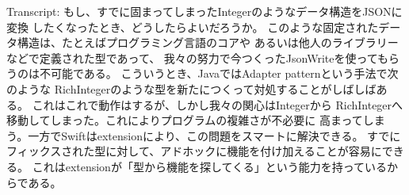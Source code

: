 \begin{frame}[fragile]
\begin{notes}
    \item Transcript:
    もし、すでに固まってしまったIntegerのようなデータ構造をJSONに変換
    したくなったとき、どうしたらよいだろうか。
    このような固定されたデータ構造は、たとえばプログラミング言語のコアや
    あるいは他人のライブラリーなどで定義された型であって、
    我々の努力で今つくったJsonWriteを使ってもらうのは不可能である。
    こういうとき、JavaではAdapter patternという手法で次のような
    RichIntegerのような型を新たにつくって対処することがしばしばある。
    これはこれで動作はするが、しかし我々の関心はIntegerから
    RichIntegerへ移動してしまった。これによりプログラムの複雑さが不必要に
    高まってしまう。一方でSwiftはextensionにより、この問題をスマートに解決できる。
    すでにフィックスされた型に対して、アドホックに機能を付け加えることが容易にできる。
    これはextensionが「型から機能を探してくる」という能力を持っているからである。
  \end{notes}
\end{frame}


